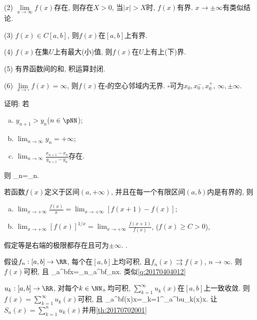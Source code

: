 (2) $\lim\limits_{x\to\infty}f(x)$存在, 则存在$X>0$, 当$|x|>X$时, $f(x)$有界. $x\to\pm\infty$有类似结论.

(3) $f(x)\in C[a,b]$, 则$f(x)$在$[a,b]$上有界.

(4) $f(x)$在集$U$上有最大(小)值, 则$f(x)$在$U$上有上(下)界.

(5) 有界函数间的和, 积运算封闭.

(6) $\lim\limits_{x\to\square}f(x)=\infty$, 则$f(x)$在$\square$的空心邻域内无界. $\square$可为$x_0, x_0^-, x_0^+$, $\infty, \pm\infty$.
\et

证明: 若
\begin{enumerate}[(a)]
 \item $y_{n+1}>y_n$($n\in\pNN$);
 \item $\lim_{n\to\infty}y_n=+\infty$;
 \item $\lim_{n\to\infty}\frac{x_{n+1}-x_n}{y_{n+1}-y_n}$存在.
\end{enumerate}
则
\bee
\lim_{n\to\infty}=\lim_{n\to\infty}.
\eee
\et

若函数$f(x)$定义于区间$(a,+\infty)$, 并且在每一个有限区间$(a,b)$内是有界的, 则
\begin{enumerate}[(a)]
 \item $\lim_{x\to+\infty}\frac{f(x)}{x}=\lim_{x\to+\infty}[f(x+1)-f(x)]$;
 \item $\lim_{x\to+\infty}[f(x)]^{1/x}=\lim_{x\to+\infty}\frac{f(x+1)}{f(x)}$, ($f(x)\ge C>0$),
\end{enumerate}
假定等是右端的极限都存在且可为$\pm\infty$.
\et
{}.

假设$f_n: [a,b]\to\RR$, 每个在$[a,b]$上均可积, 且$f_n(x)\rightrightarrows f(x)$, $n\to\infty$.
则$f(x)$可积, 且
\bee
\int_a^bf\ud x=\lim_{n\to\infty}\int_a^bf_n\ud x.
\eee
\et
\ba
类似\ref{q:20170404012}
\ea

$u_k: [a,b]\to\RR$, 对每个$k\in\NN_+$均可积, $\sum_{k=1}^{\infty}u_k(x)$在$[a,b]$上一致收敛.
则$f(x)=\sum_{k=1}^{\infty}u_k(x)$可积, 且
\bee
\int_a^bf(x)\ud x=\sum_{k=1}^{\infty}\int_a^bu_k(x)\ud x.
\eee
\et
\ba
让$S_n(x)=\sum_{k=1}^nu_k(x)$并用\ref{th:20170702001}
\ea

